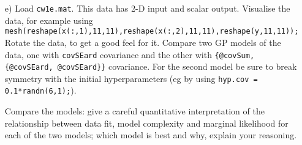 \documentclass[12pt]{article}
\begin{document}
\begin{enumerate}
\item[e)] Load \texttt{cw1e.mat}. This data has 2-D input and
  scalar output. Visualise the data, for example using
  \texttt{mesh(reshape(x(:,1),11,11),reshape(x(:,2),11,11),reshape(y,11,11));}
  Rotate the data, to get a good feel for it. Compare two GP models of
  the data, one with \texttt{covSEard} covariance and the other with 
  \texttt{\{@covSum, \{@covSEard, @covSEard\}\}} covariance. For the
  second model be sure to break symmetry with the initial
  hyperparameters (eg by using \texttt{hyp.cov =
    0.1*randn(6,1);}). 

  Compare the models: give a careful quantitative interpretation of
  the relationship between data fit, model complexity and marginal
  likelihood for each of the two models; which model is best and why,
  explain your reasoning.

\end{enumerate}
\end{document}
